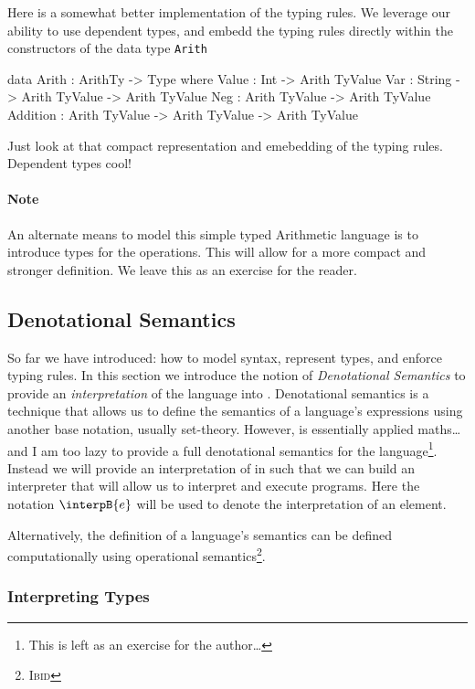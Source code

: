Here is a somewhat better implementation of the typing rules.
We leverage our ability to use dependent types, and embedd the typing rules directly within the constructors of the data type \texttt{Arith}

\begin{code}
data Arith : ArithTy -> Type where
  Value    : Int                            -> Arith TyValue
  Var      : String        -> Arith TyValue -> Arith TyValue
  Neg      : Arith TyValue                  -> Arith TyValue
  Addition : Arith TyValue -> Arith TyValue -> Arith TyValue
\end{code}

\noindent
Just look at that compact representation and emebedding of the typing rules.
Dependent types cool!


\paragraph{Note}
An alternate means to model this simple typed Arithmetic language is to introduce types for the operations.
This will allow for a more compact and stronger definition.
We leave this as an exercise for the reader.

\subsection{Denotational Semantics}
\label{sec:typed-arith:semantics}

So far we have introduced: how to model syntax, represent types, and enforce typing rules.
In this section we introduce the notion of \emph{Denotational Semantics} to provide an \emph{interpretation} of the language into \idris{}.
Denotational semantics is a technique that allows us to define the semantics of a language's expressions using another base notation, usually set-theory.
However, \idris{} is essentially applied maths\ldots and I am too lazy to provide a full denotational semantics for the language\footnote{This is left as an exercise for the author\ldots}.
Instead  we will provide an interpretation of in \idris{} such that we can build an interpreter that will allow us to interpret and execute programs.
Here the notation $\interpB{e}$ will be used to denote the interpretation of an element.

Alternatively, the definition of a language's semantics can be defined computationally using operational semantics\footnote{\textsc{Ibid}}.

\subsubsection{Interpreting Types}
\label{sec:typed-arith:semantics:types}

